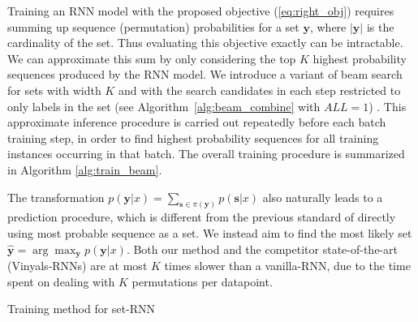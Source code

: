 Training an RNN model with the proposed objective (\ref{eq:right_obj}) requires summing up sequence (permutation) probabilities for a set $\mathbf{y}$, where $|\mathbf{y}|$ is the cardinality of the set. Thus evaluating this objective exactly can be intractable. We can approximate this sum by only considering the top $K$ highest probability sequences produced by the RNN model. We introduce a variant of beam search for sets with width $K$ and with the search candidates in each step restricted to only labels in the set (see Algorithm~\ref{alg:beam_combine} with $ALL=1$)%
. This approximate inference procedure is carried out repeatedly before each batch training step, in order to find highest probability sequences for all training instances occurring in that batch. The overall training procedure is summarized in Algorithm \ref{alg:train_beam}.

The transformation $p(\mathbf{y}|x)=\sum_{\mathbf{s}\in \pi(\mathbf{y})} p(\mathbf{s}|x)$ also naturally leads to a prediction procedure, which is different from the previous standard of directly using most probable sequence as a set. We instead aim to find the most likely set $\hat{\mathbf{y}}=\arg\max_{\mathbf{y}} p(\mathbf{y}|x)$. %
Both our method and the competitor state-of-the-art (Vinyals-RNNs) are at most $K$ times slower than a vanilla-RNN,  due to the time spent on dealing with $K$ permutations per datapoint. 

\begin{algorithm}

  
  \caption{Training method for set-RNN}
  \label{alg:train_beam}
\end{algorithm}

